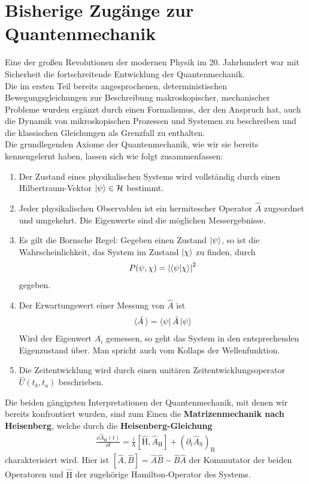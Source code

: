 \section{Bisherige Zugänge zur Quantenmechanik}
Eine der großen Revolutionen der modernen Physik im 20. Jahrhundert war mit Sicherheit die fortschreitende Entwicklung der Quantenmechanik. \\
Die im ersten Teil bereits angesprochenen, deterministischen Bewegungsgleichungen zur Beschreibung makroskopischer, mechanischer Probleme wurden ergänzt durch einen Formalismus, der den Anspruch hat, auch die Dynamik von mikroskopischen Prozessen und Systemen zu beschreiben und die klassischen Gleichungen als Grenzfall zu enthalten. \\
Die grundlegenden Axiome der Quantenmechanik, wie wir sie bereits kennengelernt haben, lassen sich wie folgt zusammenfassen:
\begin{enumerate}
	\item Der Zustand eines physikalischen Systems wird vollständig durch einen Hilbertraum-Vektor $\ket{\psi} \in \mathcal{H}$ bestimmt.
	\item Jeder physikalischen Observablen ist ein hermitescher Operator $\hat{A}$ zugeordnet und umgekehrt. Die Eigenwerte sind die möglichen Messergebnisse.
	\item Es gilt die Bornsche Regel: Gegeben einen Zustand $\ket{\psi} $, so ist die Wahrscheinlichkeit, das System im Zustand $\ket{\chi}$ zu finden, durch
	\begin{align}
		P(\psi, \chi) = \abs{\braket{\psi}{\chi}}^2
	\end{align}
	gegeben.
	\item Der Erwartungswert einer Messung von $\hat{A}$ ist 
	\begin{align}
		\langle \hat{A} \hspace{2pt} \rangle = \bra{\psi}\hat{A}\ket{\psi}
	\end{align}
 	 Wird der Eigenwert $A_i$ gemessen, so geht das System in den entsprechenden Eigenzustand über. Man spricht auch vom Kollaps der Wellenfunktion.
 	 \item  Die Zeitentwicklung wird durch einen unitären Zeitentwicklungsoperator $\hat{U}(t_b, t_a)$ beschrieben.
\end{enumerate}
Die beiden gängigsten Interpretationen der Quantenmechanik, mit denen wir bereits konfrontiert wurden, sind zum Einen die \textbf{Matrizenmechanik nach Heisenberg}, welche durch die \textbf{Heisenberg-Gleichung}
\begin{align}
	\frac{\dd\hat{A}_{\text{H}}(t)}{\dd t} = \frac{i}{\hbar}\left[\hat{\text{H}},\hat{A}_{\text{H}}\right] + \left(\partial_t \hat{A}_{\text{S}}\right)_{\text{H}}
\end{align}
 charakterisiert wird. Hier ist $\left[\hat{A},\hat{B}\right] = \hat{A}\hat{B} - \hat{B}\hat{A}$ der Kommutator der beiden Operatoren und $\hat{\text{H}}$ der zugehörige Hamilton-Operator des Systems. \\
 
